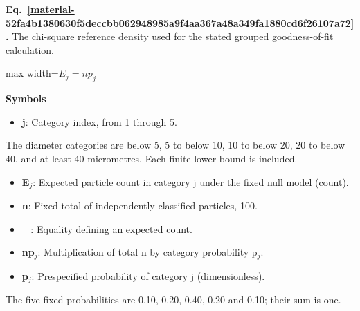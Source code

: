 \documentclass[11pt,a4paper]{article}
\begin{document}
\par\medskip
\noindent\begin{minipage}{\linewidth}
\label{material-52fa4b1380630f5deccbb062948985a9f4aa367a48a349fa1880cd6f26107a72}
\noindent\textbf{Eq.~\ref*{material-52fa4b1380630f5deccbb062948985a9f4aa367a48a349fa1880cd6f26107a72}.} The chi-square reference density used for the stated grouped goodness-of-fit calculation.\par\nopagebreak
\begin{center}\begin{adjustbox}{max width=\linewidth}$\displaystyle E_j=n p_j$\end{adjustbox}\end{center}

\par\noindent\textbf{Symbols}

\begin{itemize}\setlength{\itemsep}{1pt}\setlength{\parsep}{0pt}
\item \textbf{j}: Category index, from 1 through 5.
\end{itemize}

The diameter categories are below 5, 5 to below 10, 10 to below 20, 20 to below 40, and at least 40 micrometres. Each finite lower bound is included.

\begin{itemize}\setlength{\itemsep}{1pt}\setlength{\parsep}{0pt}
\item \textbf{E\ensuremath{{}_j}}: Expected particle count in category j under the fixed null model (count).
\end{itemize}

\begin{itemize}\setlength{\itemsep}{1pt}\setlength{\parsep}{0pt}
\item \textbf{n}: Fixed total of independently classified particles, 100.
\item \textbf{=}: Equality defining an expected count.
\item \textbf{np\ensuremath{{}_j}}: Multiplication of total n by category probability p\ensuremath{{}_j}.
\end{itemize}

\begin{itemize}\setlength{\itemsep}{1pt}\setlength{\parsep}{0pt}
\item \textbf{p\ensuremath{{}_j}}: Prespecified probability of category j (dimensionless).
\end{itemize}

The five fixed probabilities are 0.10, 0.20, 0.40, 0.20 and 0.10; their sum is one.

\end{minipage}\par
\medskip
\end{document}
